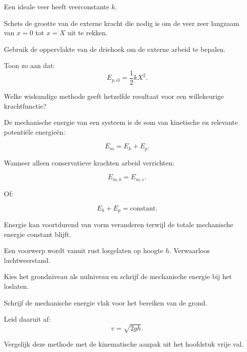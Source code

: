 \documentclass{ximera}
\begin{document}
\begin{oefening}{\oefU\ESS}

Een ideale veer heeft veerconstante $k$.

\begin{question}
Schets de grootte van de externe kracht die nodig is om de veer zeer langzaam
van $x=0$ tot $x=X$ uit te rekken.
\end{question}

\begin{question}
Gebruik de oppervlakte van de driehoek om de externe arbeid te bepalen.
\end{question}

\begin{question}
Toon zo aan dat:
\[
E_{p,\mathrm{el}}=\frac12kX^2.
\]
\end{question}

\begin{question}
Welke wiskundige methode geeft hetzelfde resultaat voor een willekeurige
krachtfunctie?
\end{question}

\end{oefening}



De mechanische energie van een systeem is de som van kinetische en relevante
potentiële energieën:

\[
\boxed{
E_m=E_k+E_p.
}
\]

Wanneer alleen conservatieve krachten arbeid verrichten:

\[
\boxed{
E_{m,b}=E_{m,e}.
}
\]

Of:

\[
\boxed{
E_k+E_p=\text{constant}.
}
\]

Energie kan voortdurend van vorm veranderen terwijl de totale mechanische
energie constant blijft.


\begin{oefening}{\oefB\ESS}

Een voorwerp wordt vanuit rust losgelaten op hoogte $h$. Verwaarloos
luchtweerstand.

\begin{question}
Kies het grondniveau als nulniveau en schrijf de mechanische energie bij het
loslaten.
\end{question}

\begin{question}
Schrijf de mechanische energie vlak voor het bereiken van de grond.
\end{question}

\begin{question}
Leid daaruit af:
\[
v=\sqrt{2gh}.
\]
\end{question}

\begin{question}
Vergelijk deze methode met de kinematische aanpak uit het hoofdstuk vrije val.
\end{question}

\end{oefening}
\end{document}

